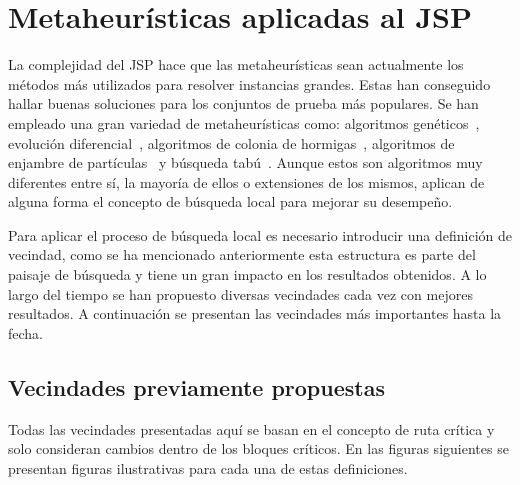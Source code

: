 \section{Metaheurísticas aplicadas al JSP}
La complejidad del JSP hace que las metaheurísticas sean actualmente los métodos más utilizados para resolver instancias grandes. 
%
Estas han conseguido hallar buenas soluciones para los conjuntos de prueba más populares. 
%
Se han empleado una gran variedad de metaheurísticas como: algoritmos genéticos~\cite{Cheng1999}, evolución diferencial~\cite{Ponsich2013}, 
algoritmos de colonia de hormigas~\cite{Klc2007}, algoritmos de enjambre de partículas~\cite{zhang2019novel} y búsqueda tabú~\cite{Zhang2007}. 
%
Aunque estos son algoritmos muy diferentes entre sí, la mayoría de ellos o extensiones de los mismos, aplican de alguna forma el concepto de 
búsqueda local para mejorar su desempeño.

Para aplicar el proceso de búsqueda local es necesario introducir una definición de vecindad, como se ha mencionado anteriormente esta estructura es parte 
del paisaje de búsqueda y tiene un gran impacto en los resultados obtenidos. 
%
A lo largo del tiempo se han propuesto diversas vecindades cada vez con mejores resultados. 
%
A continuación se presentan las vecindades más importantes hasta la fecha. 


\subsection*{Vecindades previamente propuestas}
Todas las vecindades presentadas aquí se basan en el concepto de ruta crítica y solo consideran cambios dentro de los bloques críticos. 
%
En las figuras siguientes se presentan figuras ilustrativas para cada una de estas definiciones.

